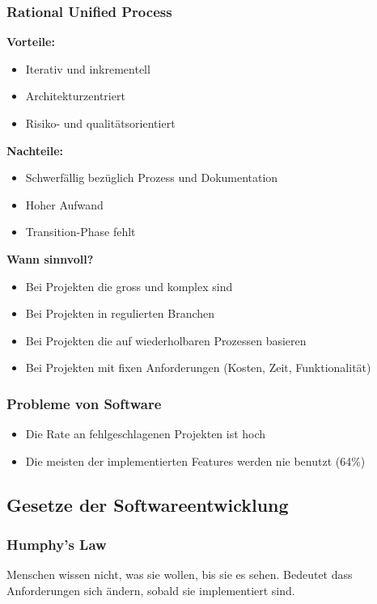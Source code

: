 \subsubsection{Rational Unified Process}
\label{subsubsec:rational-unified-process}
\textbf{Vorteile:}
\begin{itemize}
    \item Iterativ und inkrementell
    \item Architekturzentriert
    \item Risiko- und qualitätsorientiert
\end{itemize}
\textbf{Nachteile:}
\begin{itemize}
    \item Schwerfällig bezüglich Prozess und Dokumentation
    \item Hoher Aufwand
    \item Transition-Phase fehlt
\end{itemize}

\textbf{Wann sinnvoll?}
\begin{itemize}
    \item Bei Projekten die gross und komplex sind
    \item Bei Projekten in regulierten Branchen
    \item Bei Projekten die auf wiederholbaren Prozessen basieren
    \item Bei Projekten mit fixen Anforderungen (Kosten, Zeit, Funktionalität)
\end{itemize}

\subsubsection{Probleme von Software}
\begin{itemize}
    \item Die Rate an fehlgeschlagenen Projekten ist hoch
    \item Die meisten der implementierten Features werden nie benutzt (64\%)
\end{itemize}

\subsection{Gesetze der Softwareentwicklung}
\subsubsection{Humphy's Law}
Menschen wissen nicht, was sie wollen, bis sie es sehen.
Bedeutet dass Anforderungen sich ändern, sobald sie implementiert sind.
